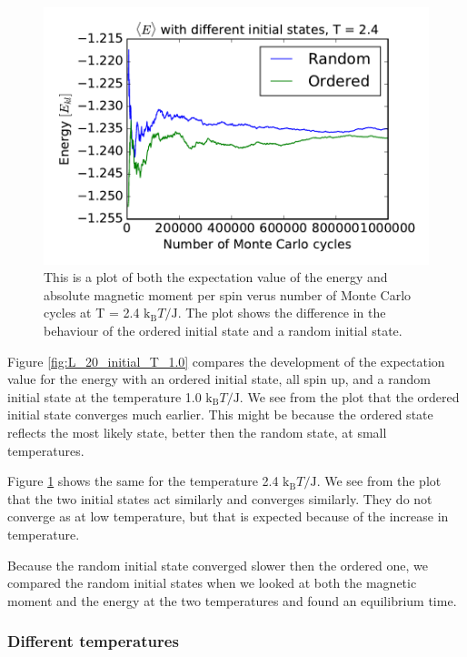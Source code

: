 \begin{figure}[H]
\includegraphics[width=\linewidth]{../results/4c/ran_order_T2}\caption{This is a plot of both the expectation value of the energy and absolute magnetic moment per spin verus number of Monte Carlo cycles at T = 2.4 $\text{k}_\text{B}T/\text{J}$. The plot shows the difference in the behaviour of the ordered initial state and a random initial state.}\label{fig:L_20_initial_T_2.4}
\end{figure}

Figure \ref{fig:L_20_initial_T_1.0} compares the development of the expectation value for the energy with an ordered initial state, all spin up, and a random initial state at the temperature 1.0 $\text{k}_\text{B}T/\text{J}$. We see from the plot that the ordered initial state converges much earlier. This might be because the ordered state reflects the most likely state, better then the random state, at small temperatures.

Figure \ref{fig:L_20_initial_T_2.4} shows the same for the temperature 2.4 $\text{k}_\text{B}T/\text{J}$. We see from the plot that the two initial states act similarly and converges similarly. They do not converge as at low temperature, but that is expected because of the increase in temperature.

Because the random initial state converged slower then the ordered one, we compared the random initial states when we looked at both the magnetic moment and the energy at the two temperatures and found an equilibrium time.

\subsubsection{Different temperatures}


